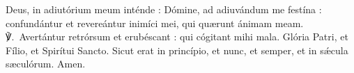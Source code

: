 Deus, in adiutórium meum inténde : Dómine, ad adiuvándum me festína : confundántur et revereántur inimíci mei, qui quærunt ánimam meam.
℣.~Avertántur retrórsum et erubéscant : qui cógitant mihi mala.
Glória Patri, et Fílio, et Spirítui Sancto.
Sicut erat in princípio, et nunc, et semper, et in sǽcula sæculórum. Amen.
